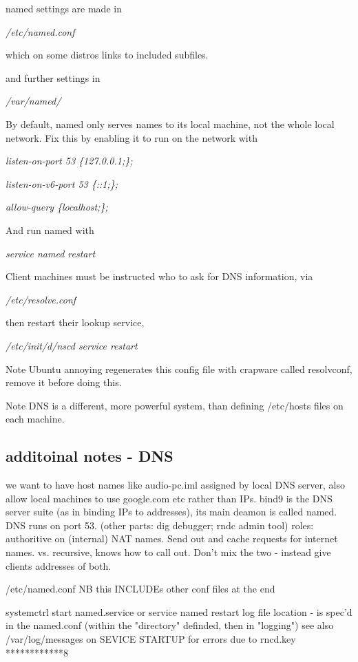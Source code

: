 \documentclass[oneside,english]{scrbook}
\begin{document}
named settings are made in

\emph{/etc/named.conf}

which on some distros links to included subfiles.

and further settings in

\emph{/var/named/}

By default, named only serves names to its local machine, not the
whole local network. Fix this by enabling it to run on the network
with

\emph{listen-on-port 53 \{127.0.0.1;\}; }

\emph{listen-on-v6-port 53 \{::1;\}; }

\emph{allow-query \{localhost;\};}

And run named with

\emph{service named restart}

Client machines must be instructed who to ask for DNS information,
via 

\emph{/etc/resolve.conf}

then restart their lookup service,

\emph{/etc/init/d/nscd service restart}

Note Ubuntu annoying regenerates this config file with crapware called
resolvconf, remove it before doing this.

Note DNS is a different, more powerful system, than defining /etc/hosts
files on each machine.


\subsection{additoinal notes - DNS}
    we want to have host names like audio-pc.iml assigned by local DNS server, also allow local machines to use google.com etc rather than IPs.
    bind9 is the DNS server suite (as in binding IPs to addresses), its main deamon is called named.  DNS runs on port 53.
        (other parts: dig debugger; rndc admin tool)
    roles: authoritive on (internal) NAT names.   Send out and cache requests for internet names.
        vs. recursive, knows how to call out.   Don't mix the two - instead give clients addresses of both.

    /etc/named.conf
        NB this INCLUDEs other conf files at the end

    systemctrl start named.service      or  service named restart
    log file location - is spec'd in the named.conf (within the "directory" definded, then in "logging")
    see also /var/log/messages on SEVICE STARTUP for errors due to rncd.key ************8
\end{document}
